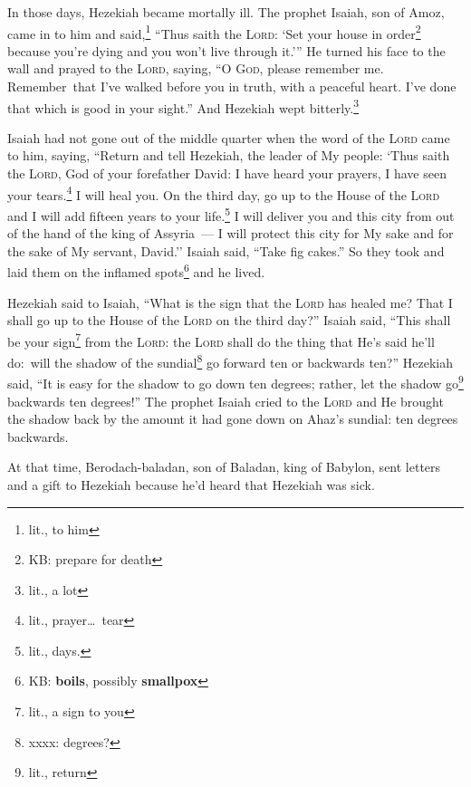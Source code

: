 
\begin{inparaenum}
     In those days, Hezekiah became mortally ill. The prophet Isaiah, son of Amoz, came in to him and said,\footnote{lit., to him} ``Thus saith the \textsc{Lord}: `Set your house in order\footnote{KB: prepare for death} because you're dying and you won't live through it.'\thinspace''%
     He turned his face to the wall and prayed to the \textsc{Lord}, saying,%
     ``O \textsc{God}, please remember me. Remember\understood\ that I've walked before you in truth, with a peaceful heart. I've done that which is good in your sight.'' And Hezekiah wept bitterly.\footnote{lit., a lot}%
    
     Isaiah had not gone out of the middle quarter when the word of the \textsc{Lord} came to him, saying,%
     ``Return and tell Hezekiah, the leader of My people: `Thus saith the \textsc{Lord}, God of your forefather David: I have heard your prayers, I have seen your tears.\footnote{lit., prayer\dots\ tear} I will heal you. On the third day, go up to the House of the \textsc{Lord}%
     and I will add fifteen years to your life.\footnote{lit., days.} I will deliver you and this city from out of the hand of the king of Assyria~--- I will protect this city for My sake and for the sake of My servant, David.''%
     Isaiah said, ``Take fig cakes.'' So they took and laid them on the inflamed spots\footnote{KB: \textbf{boils}, possibly \textbf{smallpox}} and he lived.%
    
     Hezekiah said to Isaiah, ``What is the sign that the \textsc{Lord} has healed me? That I shall go up to the House of the \textsc{Lord} on the third day?''%
     Isaiah said, ``This shall be your sign\footnote{lit., a sign to you} from the \textsc{Lord}: the \textsc{Lord} shall do the thing that He's said he'll do:\understood\ will the shadow of the sundial\footnote{xxxx: degrees?} go forward ten or backwards ten?''%
     Hezekiah said, ``It is easy for the shadow to go down ten degrees; rather, let the shadow go\footnote{lit., return} backwards ten degrees!''%
     The prophet Isaiah cried to the \textsc{Lord} and He brought the shadow back by the amount it had gone down on Ahaz's sundial: ten degrees backwards.%
    
     At that time, Berodach-baladan, son of Baladan, king of Babylon, sent letters and a gift to Hezekiah because he'd heard that Hezekiah was sick.%
    

\end{inparaenum}
